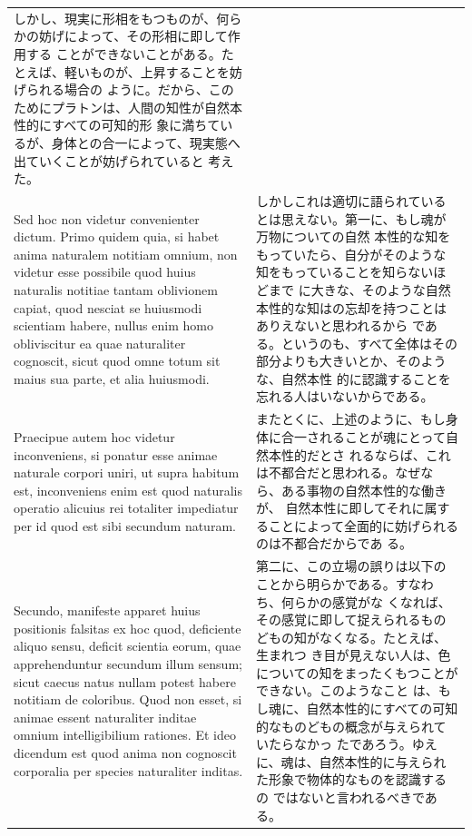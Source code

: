 \documentclass[paper=a4paper,fontsize=10pt,jafontsize=9pt,titlepage]{jlreq}
\begin{document}
\begin{longtable}{p{21em}p{21em}}
 しかし、現実に形相をもつものが、何らかの妨げによって、その形相に即して作用する
 ことができないことがある。たとえば、軽いものが、上昇することを妨げられる場合の
 ように。だから、このためにプラトンは、人間の知性が自然本性的にすべての可知的形
 象に満ちているが、身体との合一によって、現実態へ出ていくことが妨げられていると
 考えた。

\\[1em]


Sed hoc non videtur convenienter dictum.  Primo quidem quia, si habet anima
 naturalem notitiam omnium, non videtur esse possibile quod huius naturalis
 notitiae tantam oblivionem capiat, quod nesciat se huiusmodi scientiam habere,
 nullus enim homo obliviscitur ea quae naturaliter cognoscit, sicut quod omne
 totum sit maius sua parte, et alia huiusmodi. 
 
 &

 しかしこれは適切に語られているとは思えない。第一に、もし魂が万物についての自然
 本性的な知をもっていたら、自分がそのような知をもっていることを知らないほどまで
 に大きな、そのような自然本性的な知はの忘却を持つことはありえないと思われるから
 である。というのも、すべて全体はその部分よりも大きいとか、そのような、自然本性
 的に認識することを忘れる人はいないからである。

\\[1em]


 Praecipue autem hoc videtur inconveniens, si ponatur esse animae naturale
 corpori uniri, ut supra habitum est, inconveniens enim est quod naturalis
 operatio alicuius rei totaliter impediatur per id quod est sibi secundum
 naturam.

 &

 またとくに、上述のように、もし身体に合一されることが魂にとって自然本性的だとさ
 れるならば、これは不都合だと思われる。なぜなら、ある事物の自然本性的な働きが、
 自然本性に即してそれに属することによって全面的に妨げられるのは不都合だからであ
 る。


 \\[1em]


 Secundo, manifeste apparet huius positionis falsitas ex hoc quod, deficiente
 aliquo sensu, deficit scientia eorum, quae apprehenduntur secundum illum
 sensum; sicut caecus natus nullam potest habere notitiam de coloribus. Quod non
 esset, si animae essent naturaliter inditae omnium intelligibilium rationes. Et
 ideo dicendum est quod anima non cognoscit corporalia per species naturaliter
 inditas.

 
 &

 第二に、この立場の誤りは以下のことから明らかである。すなわち、何らかの感覚がな
 くなれば、その感覚に即して捉えられるものどもの知がなくなる。たとえば、生まれつ
 き目が見えない人は、色についての知をまったくもつことができない。このようなこと
 は、もし魂に、自然本性的にすべての可知的なものどもの概念が与えられていたらなかっ
 たであろう。ゆえに、魂は、自然本性的に与えられた形象で物体的なものを認識するの
 ではないと言われるべきである。


\end{longtable}
\end{document}
